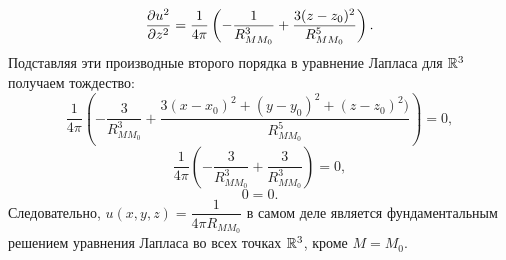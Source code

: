 \documentclass[../main.tex]{subfiles}
\begin{document}
\begin{enumerate}
\[        \]
        \[
            \pderivTwo{u}{z}{z} = \dfrac{1}{4\pi} \left(-\dfrac{1}{R_{MM_0}^3} + \dfrac{3(z-z_0)^2}{R_{MM_0}^5}\right).
        \]
        Подставляя эти производные второго порядка в уравнение Лапласа для $\mathbb{R}^3$ получаем тождество:
        \[
            \dfrac{1}{4\pi}\left(-\dfrac{3}{R_{MM_0}^3} + \dfrac{3(x-x_0)^2 + (y-y_0)^2 + (z-z_0)^2)}{R_{MM_0}^5}\right) = 0,
        \]
        \[
            \dfrac{1}{4\pi}\left(-\dfrac{3}{R_{MM_0}^3} + \dfrac{3}{R_{MM_0}^3}\right) = 0,
        \]
        \[
            0 = 0.
        \]
        Следовательно, $u(x, y, z) = \dfrac{1}{4\pi R_{MM_0}}$ в самом деле является фундаментальным решением уравнения Лапласа во всех точках $\mathbb{R}^3$, кроме $M = M_0$.
    \end{enumerate}
\end{document}
